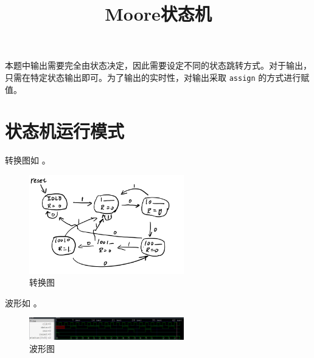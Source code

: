 \documentclass[lang=cn]{elegantpaper}
\title{Moore状态机}
\begin{document}
\maketitle



本题中输出需要完全由状态决定，因此需要设定不同的状态跳转方式。对于输出，只需在特定状态输出即可。为了输出的实时性，对输出采取 \lstinline{assign} 的方式进行赋值。

 \section{状态机运行模式}

转换图如  。

\begin{figure}[htb]
    \centering
    \caption{转换图}\label{01}
    \includegraphics[width=0.6\textwidth]{trans.png}
\end{figure}




波形如  。


\begin{figure}[htb]
    \centering
    \caption{波形图}\label{02}
    \includegraphics[width=0.6\textwidth]{wave.png}
\end{figure}
\end{document}
